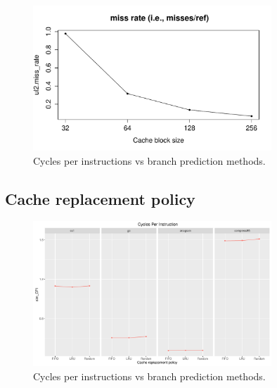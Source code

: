 \documentclass[10pt]{scrartcl}
\begin{document}
\begin{figure}[h]
  \centering
  \includegraphics[width=0.8\textwidth]{NewPlots/plot_BS_G_miss-rate}
  \caption{Cycles per instructions vs branch prediction methods.}\label{fig:cache-bs_G_miss_rate}
\end{figure}


\FloatBarrier

\subsection{Cache replacement policy}

\begin{figure}[h]
  \centering
  \includegraphics[width=0.8\textwidth]{Plots/plot_CacheRP_sim_CPI}
  \caption{Cycles per instructions vs branch prediction methods.}\label{fig:cache-rp_sim_cpi}
\end{figure}
\end{document}
